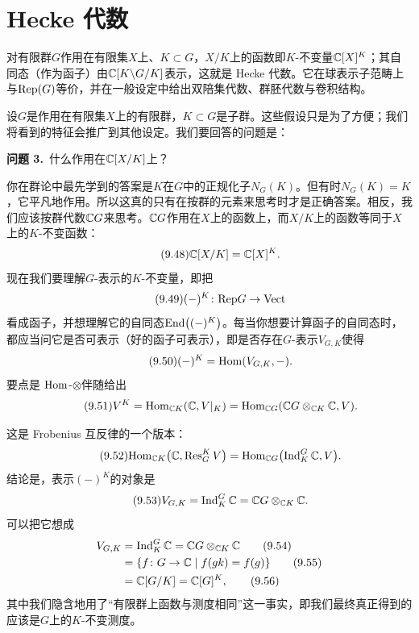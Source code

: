 \section{Hecke 代数}\label{sec:9.2}
\begin{sectionkey}
对有限群$G$作用在有限集$X$上、$K\subset G$，$X/K$上的函数即$K$-不变量$\mathbb{C}[X]^K$；其自同态（作为函子）由$\mathbb{C}[K\backslash G/K]$表示，这就是 Hecke 代数。它在球表示子范畴上与$\mathrm{Rep}(G)$等价，并在一般设定中给出双陪集代数、群胚代数与卷积结构。
\end{sectionkey}

设$G$是作用在有限集$X$上的有限群，$K\subset G$是子群。这些假设只是为了方便；我们将看到的特征会推广到其他设定。我们要回答的问题是：

\medskip
\noindent\textbf{问题 3.}\ 什么作用在$\mathbb{C}[X/K]$上？

你在群论中最先学到的答案是$K$在$G$中的正规化子$N_G(K)$。但有时$N_G(K)=K$，它平凡地作用。所以这真的只有在按群的元素来思考时才是正确答案。相反，我们应该按群代数$\mathbb{C} G$来思考。$\mathbb{C} G$作用在$X$上的函数上，而$X/K$上的函数等同于$X$上的$K$-不变函数：
\begin{equation}\tag{9.48}
\mathbb{C}[X/K]=\mathbb{C}[X]^{K}.
\end{equation}
现在我们要理解$G$-表示的$K$-不变量，即把
\begin{equation}\tag{9.49}
(-)^{K}\colon\mathrm{Rep} G\to\mathrm{Vect}
\end{equation}
看成函子，并想理解它的自同态$\mathrm{End}\bigl((-)^{K}\bigr)$。每当你想要计算函子的自同态时，都应当问它是否可表示（好的函子可表示），即是否存在$G$-表示$V_{G,K}$使得
\begin{equation}\tag{9.50}
(-)^{K}=\mathrm{Hom}(V_{G,K},-).
\end{equation}
要点是 $\mathrm{Hom}$-$\otimes$伴随给出
\begin{equation}\tag{9.51}
V^{K}=\mathrm{Hom}_{\mathbb{C} K}(\mathbb{C},V|_{K})=\mathrm{Hom}_{\mathbb{C} G}(\mathbb{C} G\otimes_{\mathbb{C} K}\mathbb{C},V).
\end{equation}

这是 Frobenius 互反律的一个版本：
\begin{equation}\tag{9.52}
\mathrm{Hom}_{\mathbb{C} K}\bigl(\mathbb{C},\operatorname{Res}^{K}_{G}V\bigr)=\mathrm{Hom}_{\mathbb{C} G}\bigl(\operatorname{Ind}^{G}_{K}\mathbb{C},V\bigr).
\end{equation}
结论是，表示$(-)^K$的对象是
\begin{equation}\tag{9.53}
V_{G,K}=\operatorname{Ind}^{G}_{K}\mathbb{C}=\mathbb{C} G\otimes_{\mathbb{C} K}\mathbb{C}.
\end{equation}
可以把它想成
\begin{align}
V_{G,K}&=\operatorname{Ind}^{G}_{K}\mathbb{C}=\mathbb{C} G\otimes_{\mathbb{C} K}\mathbb{C}\tag{9.54}\\
&=\{f\colon G\to\mathbb{C}\mid f(gk)=f(g)\}\tag{9.55}\\
&=\mathbb{C}[G/K]=\mathbb{C}[G]^{K},\tag{9.56}
\end{align}
其中我们隐含地用了“有限群上函数与测度相同”这一事实，即我们最终真正得到的应该是$G$上的$K$-不变测度。

